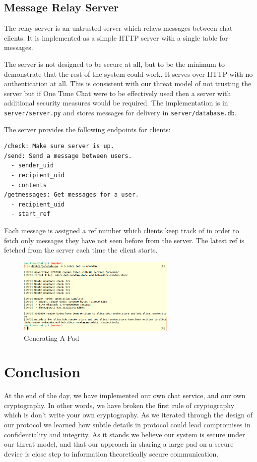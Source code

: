 \documentclass[twocolumn]{article}
\begin{document}
\subsection{Message Relay Server}
The relay server is an untrusted server which relays messages between chat clients.
It is implemented as a simple HTTP server with a single table for messages.

The server is not designed to be secure at all, but to be the minimum to demonstrate that
the rest of the system could work. It serves over HTTP with no authentication at all.
This is consistent with our threat model of not trusting the server but if One Time Chat were to be effectively used then a server with additional security measures would be required. The implementation is in \texttt{server/server.py} and stores messages for delivery in \texttt{server/database.db}.

The server provides the following endpoints for clients:
\begin{lstlisting}
/check: Make sure server is up.
/send: Send a message between users.
  - sender_uid
  - recipient_uid
  - contents
/getmessages: Get messages for a user.
  - recipient_uid
  - start_ref
\end{lstlisting}

Each message is assigned a ref number which clients keep track of in order
to fetch only messages they have not seen before from the server.
The latest ref is fetched from the server each time the client starts.


\label{sec:padgen}
\begin{figure}[htp]
\centering
\includegraphics[width=3in]{generate}
\caption{Generating A Pad}
\end{figure}


\section{Conclusion}
At the end of the day, we have implemented our own chat service, and our own cryptography. In other words, we have broken the first rule of cryptography which is don't write your own cryptography. As we iterated through the design of our protocol we learned how subtle details in protocol could lead compromises in confidentiality and integrity. As it stands we believe our system is secure under our threat model, and that our approach in sharing a large pad on a secure device is close step to information theoretically secure communication.


\end{document}
